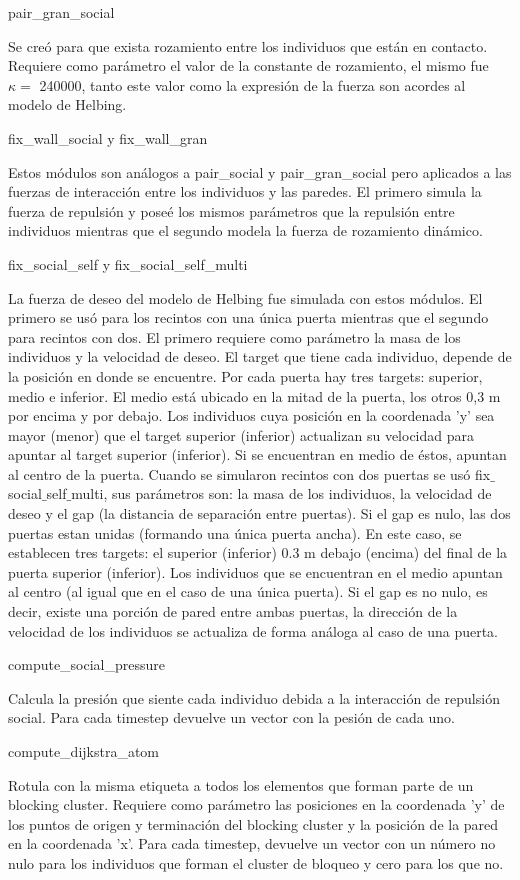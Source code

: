 {\Large pair\_gran\_social}

Se creó para que exista rozamiento entre los individuos que están en contacto. Requiere como parámetro el valor de la constante de rozamiento, el mismo fue $\kappa =$ 240000, tanto este valor como la expresión de la fuerza son acordes al modelo de Helbing.

{\Large fix\_wall\_social y fix\_wall\_gran}

Estos módulos son análogos a pair\_social y pair\_gran\_social pero aplicados a las fuerzas de interacción entre los individuos y las paredes. El primero simula la fuerza de repulsión y poseé los mismos parámetros que la repulsión entre individuos mientras que el segundo modela la fuerza de rozamiento dinámico. 

{\Large fix\_social\_self y fix\_social\_self\_multi}

La fuerza de deseo del modelo de Helbing fue simulada con estos módulos. El primero se usó para los recintos con una única puerta mientras que el segundo para recintos con dos. 
El primero requiere como parámetro la masa de los individuos y la velocidad de deseo. El target que tiene cada individuo, depende de la posición en donde se encuentre. Por cada puerta hay tres targets: superior, medio e inferior. El medio está ubicado en la mitad de la puerta, los otros 0,3 m por encima y por debajo.  Los individuos cuya posición en la coordenada 'y' sea mayor (menor) que el target superior (inferior) actualizan su velocidad para apuntar al target superior (inferior). Si se encuentran en medio de éstos, apuntan al centro de la puerta. 
Cuando se simularon recintos con dos puertas se usó fix$\_$social$\_$self$\_$multi, sus parámetros son: la masa de los individuos, la velocidad de deseo y el gap (la distancia de separación entre puertas). Si el gap es nulo, las dos puertas estan unidas (formando una única puerta ancha). En este caso, se establecen tres targets: el superior (inferior) 0.3 m debajo (encima) del final de la puerta superior (inferior). Los individuos que se encuentran en el medio apuntan al centro (al igual que en el caso de una única puerta).
Si el gap es no nulo, es decir, existe una porción de pared entre ambas puertas, la dirección de la velocidad de los individuos se actualiza de forma análoga al caso de una puerta. 

{\Large compute\_social\_pressure}

Calcula la presión que siente cada individuo debida a la interacción de repulsión social. Para cada timestep devuelve un vector con la pesión de cada uno. 

{\Large compute\_dijkstra\_atom}

Rotula con la misma etiqueta a todos los elementos que forman parte de un blocking cluster. Requiere como parámetro las posiciones en la coordenada 'y' de los puntos de origen y terminación del blocking cluster y la posición de la pared en la coordenada 'x'. Para cada timestep, devuelve un vector con un número no nulo para los individuos que forman el cluster de bloqueo y cero para los que no. 
